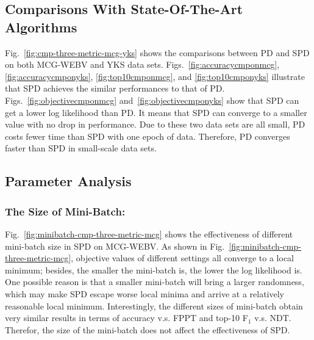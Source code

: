 \documentclass[runningheads]{llncs}
\begin{document}
\subsection{Comparisons With State-Of-The-Art Algorithms}
Fig.~\ref{fig:cmp-three-metric-mcg-yks} shows the comparisons between PD and SPD on both MCG-WEBV and YKS data sets.  Figs.~\ref{fig:accuracycmponmcg}, \ref{fig:accuracycmponyks}, \ref{fig:top10cmponmcg}, and \ref{fig:top10cmponyks} illustrate that SPD achieves the similar performances to that of PD. Figs.~\ref{fig:objectivecmponmcg} and~\ref{fig:objectivecmponyks} show that SPD can get a lower log likelihood than PD. It means that SPD can converge to a smaller value with no drop in performance. Due to these two data sets are all small, PD costs fewer time than SPD with one epoch of data. Therefore, PD converges faster than SPD in small-scale data sets.


\subsection{Parameter Analysis}

\subsubsection{The Size of Mini-Batch:}
Fig.~\ref{fig:minibatch-cmp-three-metric-mcg} shows the effectiveness of different mini-batch size in SPD on MCG-WEBV. As shown in Fig.~\ref{fig:minibatch-cmp-three-metric-mcg}, objective values of different settings all converge to a local minimum; besides, the smaller the mini-batch is, the lower the log likelihood is. One possible reason is that a smaller mini-batch will bring a larger randomness, which may make SPD escape worse local minima and arrive at a relatively reasonable local minimum. Interestingly, the different sizes of mini-batch obtain very similar results in terms of accuracy v.s. FPPT and top-10 F$_1$ v.s. NDT. Therefor, the size of the mini-batch does not affect the effectiveness of SPD.
\end{document}
